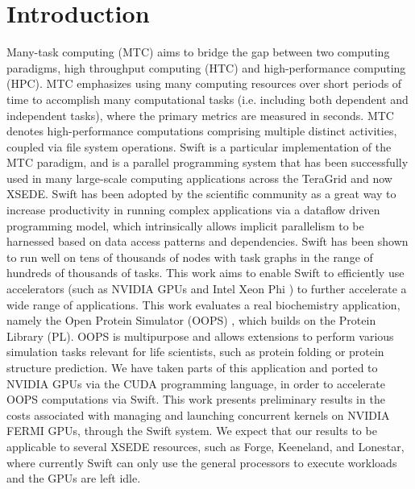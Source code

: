 \documentclass[conference]{IEEEtran}
\begin{document}
\section{Introduction}
Many-task computing (MTC) \cite{raicu2008toward} aims to bridge the gap between two computing paradigms, high throughput computing (HTC) and high-performance computing (HPC). MTC emphasizes using many computing resources over short periods of time to accomplish many computational tasks (i.e. including both dependent and independent tasks), where the primary metrics are measured in seconds. MTC denotes high-performance computations comprising multiple distinct activities, coupled via file system operations. Swift is a particular implementation of the MTC paradigm, and is a parallel programming system that has been successfully used in many large-scale computing applications across the TeraGrid and now XSEDE. \cite{zhao2007swift} Swift has been adopted by the scientific community as a great way to increase productivity in running complex applications via a dataflow driven programming model, which intrinsically allows implicit parallelism to be harnessed based on data access patterns and dependencies. Swift has been shown to run well on tens of thousands of nodes with task graphs in the range of hundreds of thousands of tasks. This work aims to enable Swift to efficiently use accelerators (such as NVIDIA GPUs and Intel Xeon Phi \cite{Xeon_Phi_web}) to further accelerate a wide range of applications. This work evaluates a real biochemistry application, namely the Open Protein Simulator (OOPS) \cite{OOPS}, which builds on the Protein Library (PL). OOPS is multipurpose and allows extensions to perform various simulation tasks relevant for life scientists, such as protein folding or protein structure prediction. We have taken parts of this application and ported to NVIDIA GPUs via the CUDA programming language, in order to accelerate OOPS computations via Swift. This work presents preliminary results in the costs associated with managing and launching concurrent kernels on NVIDIA FERMI GPUs, through the Swift system. We expect that our results to be applicable to several XSEDE resources, such as Forge, Keeneland, and Lonestar, where currently Swift can only use the general processors to execute workloads and the GPUs are left idle.
\end{document}
